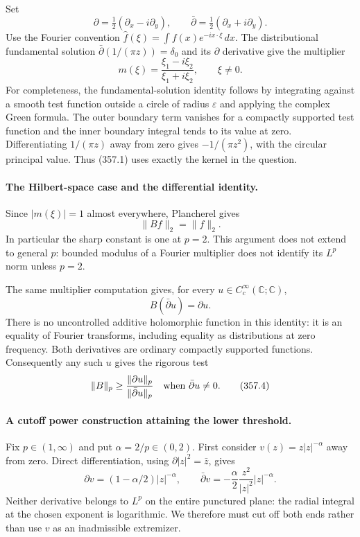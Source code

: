 \documentclass[11pt]{article}
\begin{document}
Set
\[
 \partial=\tfrac12(\partial_x-i\partial_y),\qquad
 \bar\partial=\tfrac12(\partial_x+i\partial_y).
\]
Use the Fourier convention $\widehat f(\xi)=\int f(x)e^{-ix\cdot\xi}\,dx$.
The distributional fundamental solution
$\bar\partial(1/(\pi z))=\delta_0$ and its $\partial$ derivative
give the multiplier
\[
 m(\xi)=\frac{\xi_1-i\xi_2}{\xi_1+i\xi_2},\qquad \xi\ne0.
 \tag{357.1}
\]
For completeness, the fundamental-solution identity follows by
integrating against a smooth test function outside a circle of radius
$\varepsilon$ and applying the complex Green formula. The outer
boundary term vanishes for a compactly supported test function and
the inner boundary integral tends to its value at zero. Differentiating
$1/(\pi z)$ away from zero gives $-1/(\pi z^2)$, with the circular
principal value. Thus (357.1) uses exactly the kernel in the question.

\paragraph{The Hilbert-space case and the differential identity.}
Since $|m(\xi)|=1$ almost everywhere, Plancherel gives
\[
 \|Bf\|_2=\|f\|_2.
 \tag{357.2}
\]
In particular the sharp constant is one at $p=2$. This argument does
not extend to general $p$: bounded modulus of a Fourier multiplier
does not identify its $L^p$ norm unless $p=2$.

The same multiplier computation gives, for every
$u\in C_c^\infty(\mathbb C;\mathbb C)$,
\[
 B(\bar\partial u)=\partial u.
 \tag{357.3}
\]
There is no uncontrolled additive holomorphic function in this identity:
it is an equality of Fourier transforms, including equality as
distributions at zero frequency. Both derivatives are ordinary compactly
supported functions. Consequently any such $u$ gives the rigorous test
\[
 \|B\|_p\geq\frac{\|\partial u\|_p}{\|\bar\partial u\|_p}
 \quad\hbox{when }\bar\partial u\ne0.
 \tag{357.4}
\]

\paragraph{A cutoff power construction attaining the lower threshold.}
Fix $p\in(1,\infty)$ and put $\alpha=2/p\in(0,2)$.
First consider $v(z)=z|z|^{-\alpha}$ away from zero. Direct
differentiation, using $\partial |z|^2=\bar z$, gives
\[
 \partial v=(1-\alpha/2)|z|^{-\alpha},\qquad
 \bar\partial v=-\frac\alpha2\frac{z^2}{|z|^2}|z|^{-\alpha}.
 \tag{357.5}
\]
Neither derivative belongs to $L^p$ on the entire punctured plane:
the radial integral at the chosen exponent is logarithmic. We therefore
must cut off both ends rather than use $v$ as an inadmissible extremizer.
\end{document}
